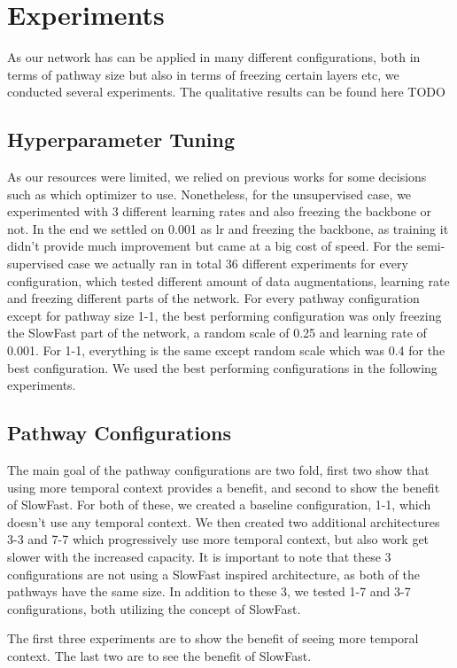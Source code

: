 \section{Experiments}
As our network has can be applied in many different configurations, both in terms of pathway size but also in terms of freezing certain layers etc, we conducted several experiments. The qualitative results can be found here TODO

\subsection{Hyperparameter Tuning}
As our resources were limited, we relied on previous works for some decisions such as which optimizer to use. Nonetheless, for the unsupervised case, we experimented with 3 different learning rates and also freezing the backbone or not. In the end we settled on 0.001 as lr and freezing the backbone, as training it didn't provide much improvement but came at a big cost of speed. For the semi-supervised case we actually ran in total 36 different experiments for every configuration, which tested different amount of data augmentations, learning rate and freezing different parts of the network. For every pathway configuration except for pathway size 1-1, the best performing configuration was only freezing the SlowFast part of the network, a random scale of 0.25 and learning rate of 0.001. For 1-1, everything is the same except random scale which was 0.4 for the best configuration. We used the best performing configurations in the following experiments.

\subsection{Pathway Configurations}
The main goal of the pathway configurations are two fold, first two show that using more temporal context provides a benefit, and second to show the benefit of SlowFast. 
For both of these, we created a baseline configuration, 1-1, which doesn't use any temporal context. We then created two additional architectures 3-3 and 7-7 which progressively use more temporal context, but also work get slower with the increased capacity. It is important to note that these 3 configurations are not using a SlowFast inspired architecture, as both of the pathways have the same size. In addition to these 3, we tested 1-7 and 3-7 configurations, both utilizing the concept of SlowFast.

The first three experiments are to show the benefit of seeing more temporal context. The last two are to see the benefit of SlowFast. 
